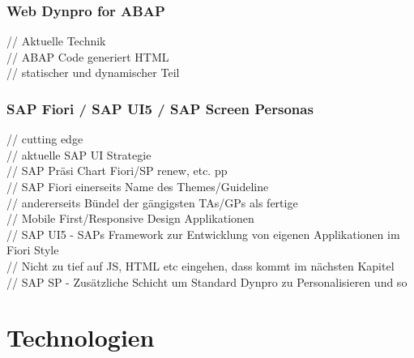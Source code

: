 \documentclass[12pt,a4paper,bibliography=totocnumbered,listof=totocnumbered]{scrartcl}
\begin{document}
\subsubsection{Web Dynpro for ABAP}
// Aktuelle Technik\\
// ABAP Code generiert HTML\\
// statischer und dynamischer Teil\\

\subsubsection{SAP Fiori / SAP UI5 / SAP Screen Personas}
// cutting edge\\
// aktuelle SAP UI Strategie\\
// SAP Präsi Chart Fiori/SP renew, etc. pp\\
// SAP Fiori einerseits Name des Themes/Guideline\\
// andererseits Bündel der gängigsten TAs/GPs als fertige\\
// Mobile First/Responsive Design Applikationen\\
// SAP UI5 - SAPs Framework zur Entwicklung von eigenen Applikationen im Fiori Style\\
// Nicht zu tief auf JS, HTML etc eingehen, dass kommt im nächsten Kapitel\\
// SAP SP - Zusätzliche Schicht um Standard Dynpro zu Personalisieren und so\\

\pagebreak
\section{Technologien}
%
\end{document}

